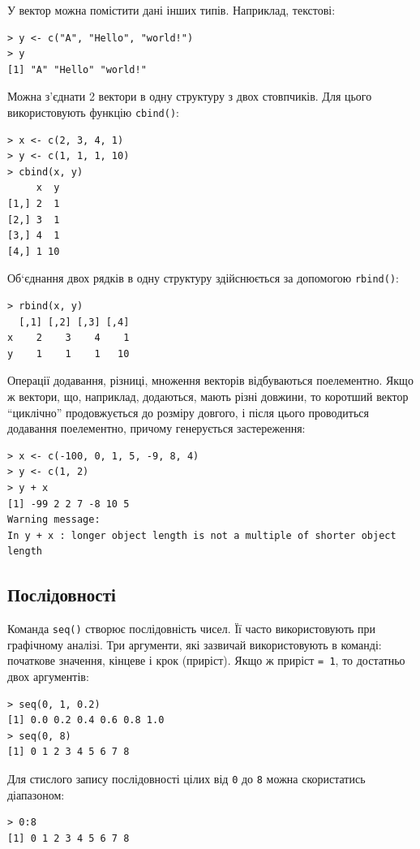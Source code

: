 \documentclass[a4paper, 12pt]{article}
\begin{document}
У вектор можна помістити дані інших типів. Наприклад, текстові:
\begin{verbatim}
> y <- c("A", "Hello", "world!")
> y
[1] "A" "Hello" "world!"
\end{verbatim}

Можна з’єднати 2 вектори в одну структуру з двох стовпчиків. Для цього використовують функцію \verb|cbind()|:
\begin{verbatim}
> x <- c(2, 3, 4, 1)
> y <- c(1, 1, 1, 10)
> cbind(x, y)
     x  y
[1,] 2  1
[2,] 3  1
[3,] 4  1
[4,] 1 10
\end{verbatim}

Об‘єднання двох рядків в одну структуру здійснюється за допомогою \verb|rbind()|:
\begin{verbatim}
> rbind(x, y)
  [,1] [,2] [,3] [,4]
x    2    3    4    1
y    1    1    1   10
\end{verbatim}

Операції додавання, різниці, множення векторів відбуваються поелементно. Якщо ж вектори, що, наприклад, додаються, мають різні довжини, то коротший вектор ``циклічно'' продовжується до розміру довгого, і після цього проводиться додавання поелементно, причому генерується застереження:

\begin{verbatim}
> x <- c(-100, 0, 1, 5, -9, 8, 4)
> y <- c(1, 2)
> y + x
[1] -99 2 2 7 -8 10 5
Warning message:
In y + x : longer object length is not a multiple of shorter object length
\end{verbatim}

\subsection{Послідовності}

Команда \verb|seq()| створює послідовність чисел. Її часто використовують при графічному аналізі. Три аргументи, які зазвичай використовують в команді: початкове значення, кінцеве і крок (приріст). Якщо ж приріст \verb|= 1|, то достатньо двох аргументів:

\begin{verbatim}
> seq(0, 1, 0.2)
[1] 0.0 0.2 0.4 0.6 0.8 1.0
> seq(0, 8)
[1] 0 1 2 3 4 5 6 7 8
\end{verbatim}

Для стислого запису послідовності цілих від \verb|0| до \verb|8| можна скористатись діапазоном:

\begin{verbatim}
> 0:8
[1] 0 1 2 3 4 5 6 7 8
\end{verbatim}
\end{document}

